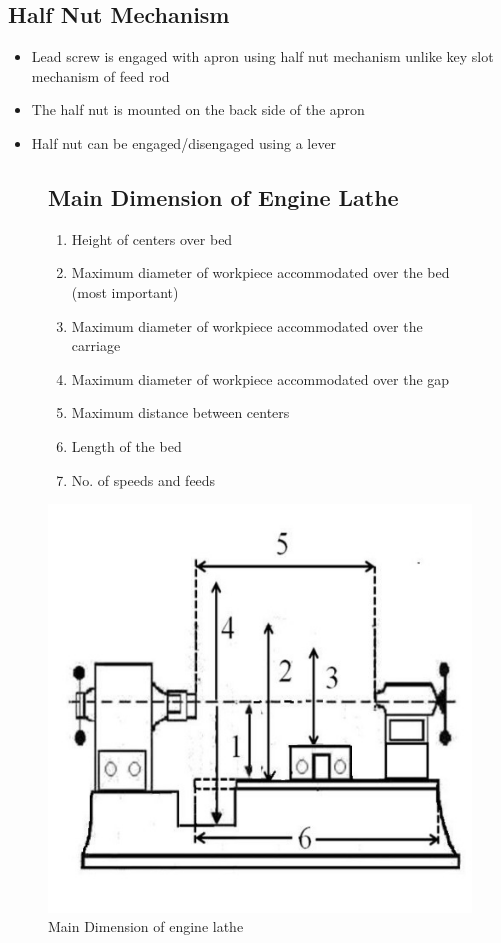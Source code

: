 \documentclass{article}
\begin{document}
\subsection*{Half Nut Mechanism}
\begin{itemize}
  \item Lead screw is engaged with apron using half nut mechanism unlike key slot mechanism of feed rod
  \item The half nut is mounted on the back side of the apron
  \item Half nut can be engaged/disengaged using a lever
\end{itemize}


\begin{figure}[ht]
  \subsection*{Main Dimension of Engine Lathe}
  \centering
  \begin{minipage}{0.5\linewidth}
    \begin{enumerate}
      \item Height of centers over bed
      \item Maximum diameter of workpiece accommodated over the bed (most important)
      \item Maximum diameter of workpiece accommodated over the carriage
      \item Maximum diameter of workpiece accommodated over the gap
      \item Maximum distance between centers
      \item Length of the bed
      \item No. of speeds and feeds
    \end{enumerate}
  \end{minipage}%
  \begin{minipage}{0.5\linewidth}
    \centering
    \includegraphics[width=\linewidth]{img/dimension.jpeg}
    \caption{Main Dimension of engine lathe}
  \end{minipage}
\end{figure}
\end{document}
